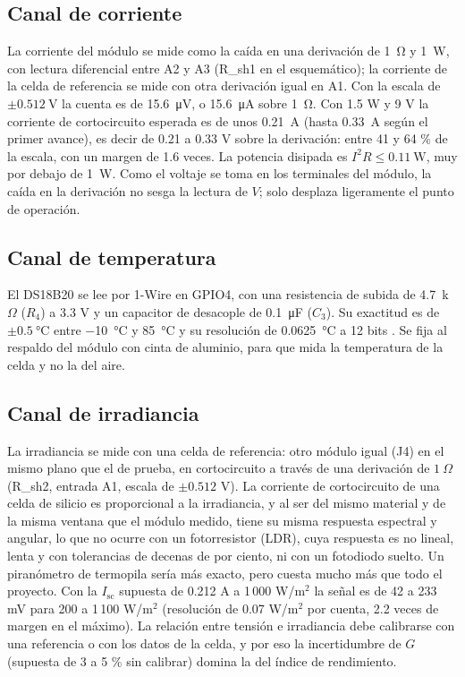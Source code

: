 \documentclass[10pt,letterpaper,twocolumn]{article}
\begin{document}
\subsection{Canal de corriente}
La corriente del módulo se mide como la caída en una derivación de \SI{1}{\ohm} y \SI{1}{\watt}, con lectura diferencial entre A2 y A3 (R\_sh1 en el esquemático); la corriente de la celda de referencia se mide con otra derivación igual en A1. Con la escala de $\pm\SI{0.512}{\volt}$ la cuenta es de \SI{15.6}{\micro\volt}, o \SI{15.6}{\micro\ampere} sobre \SI{1}{\ohm}. Con 1.5 W y 9 V la corriente de cortocircuito esperada es de unos \SI{0.21}{\ampere} (hasta \SI{0.33}{\ampere} según el primer avance), es decir de 0.21 a 0.33 V sobre la derivación: entre 41 y 64 \% de la escala, con un margen de 1.6 veces. La potencia disipada es $I^2R\le\SI{0.11}{\watt}$, muy por debajo de \SI{1}{\watt}. Como el voltaje se toma en los terminales del módulo, la caída en la derivación no sesga la lectura de $V$; solo desplaza ligeramente el punto de operación.

\subsection{Canal de temperatura}
El DS18B20 se lee por 1-Wire en GPIO4, con una resistencia de subida de 4.7~k$\Omega$ ($R_4$) a 3.3 V y un capacitor de desacople de \SI{0.1}{\micro\farad} ($C_3$). Su exactitud es de $\pm\SI{0.5}{\celsius}$ entre \SI{-10}{\celsius} y \SI{85}{\celsius} y su resolución de \SI{0.0625}{\celsius} a 12 bits \cite{ds18b20}. Se fija al respaldo del módulo con cinta de aluminio, para que mida la temperatura de la celda y no la del aire.

\subsection{Canal de irradiancia}
La irradiancia se mide con una celda de referencia: otro módulo igual (J4) en el mismo plano que el de prueba, en cortocircuito a través de una derivación de $1~\Omega$ (R\_sh2, entrada A1, escala de $\pm 0.512$ V). La corriente de cortocircuito de una celda de silicio es proporcional a la irradiancia, y al ser del mismo material y de la misma ventana que el módulo medido, tiene su misma respuesta espectral y angular, lo que no ocurre con un fotorresistor (LDR), cuya respuesta es no lineal, lenta y con tolerancias de decenas de por ciento, ni con un fotodiodo suelto. Un piranómetro de termopila sería más exacto, pero cuesta mucho más que todo el proyecto. Con la $I_\mathrm{sc}$ supuesta de 0.212 A a 1\,000 W/m$^2$ la señal es de 42 a 233 mV para 200 a 1\,100 W/m$^2$ (resolución de 0.07 W/m$^2$ por cuenta, 2.2 veces de margen en el máximo). La relación entre tensión e irradiancia debe calibrarse con una referencia o con los datos de la celda, y por eso la incertidumbre de $G$ (supuesta de 3 a 5 \% sin calibrar) domina la del índice de rendimiento.
\end{document}
